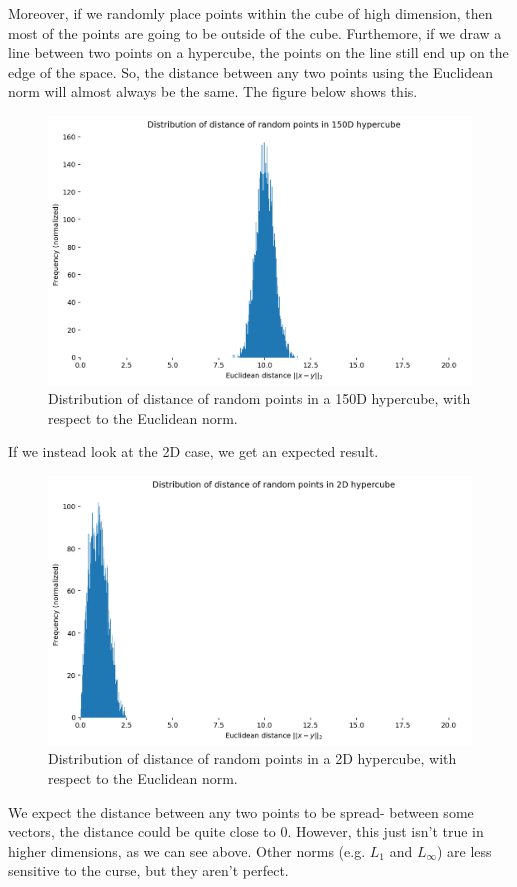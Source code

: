 \documentclass[a4paper, openany]{memoir}
\begin{document}
    Moreover, if we randomly place points within the cube of high dimension, then most of the points are going to be outside of the cube. Furthemore, if we draw a line between two points on a hypercube, the points on the line still end up on the edge of the space. So, the distance between any two points using the Euclidean norm will almost always be the same. The figure below shows this.
    \begin{figure}[H]
        \centering
        \includegraphics[scale=0.45]{src/3.8 Distribution of distance of random points 150D.png}
        \caption{Distribution of distance of random points in a 150D hypercube, with respect to the Euclidean norm.}
    \end{figure}
    If we instead look at the 2D case, we get an expected result.
    \begin{figure}[H]
        \centering
        \includegraphics[scale=0.45]{src/3.9 Distribution of distance of random points 2D.png}
        \caption{Distribution of distance of random points in a 2D hypercube, with respect to the Euclidean norm.}
    \end{figure}
    \noindent We expect the distance between any two points to be spread- between some vectors, the distance could be quite close to 0. However, this just isn't true in higher dimensions, as we can see above. Other norms (e.g. $L_1$ and $L_\infty$) are less sensitive to the curse, but they aren't perfect.
\end{document}

